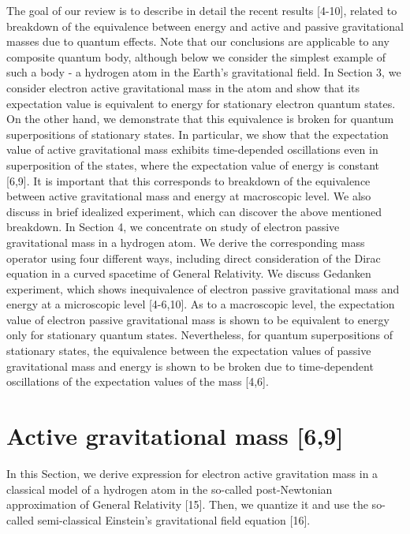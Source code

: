 \documentclass{ws-ijmpd}
\begin{document}
The goal of our review is to describe in detail the recent results
[4-10], related to breakdown of the equivalence between energy and
active and passive gravitational masses due to quantum effects.
Note that our conclusions are applicable to any composite quantum
body, although below we consider the simplest example of such a
body - a hydrogen atom in the Earth's gravitational field. In Section
3, we consider electron active gravitational mass in the atom and
show that its expectation value is equivalent to energy for
stationary electron quantum states. On the other hand, we
demonstrate that this equivalence is broken for quantum
superpositions of stationary states. In particular, we show that
the expectation value of active gravitational mass exhibits
time-depended oscillations even in superposition of the states,
where the expectation value of energy is constant [6,9]. It is important that this corresponds to breakdown of the equivalence between
active gravitational mass and energy at macroscopic level. We also
discuss in brief idealized experiment, which can discover the above
mentioned breakdown. In Section 4, we concentrate on study of
electron passive gravitational mass in a hydrogen atom. We derive
the corresponding mass operator using four different ways,
including direct consideration of the Dirac equation in a curved
spacetime of General Relativity. We discuss Gedanken experiment,
which shows inequivalence of electron passive gravitational mass
and energy at a microscopic level [4-6,10]. As to a macroscopic level, the expectation value of electron passive gravitational mass is shown
to be equivalent to energy only for stationary quantum states.
Nevertheless, for quantum superpositions of stationary states, the
equivalence between the expectation values of passive gravitational
mass and energy is shown to be broken due to time-dependent
oscillations of the expectation values of the mass [4,6].


\section{Active gravitational mass [6,9]}
In this Section, we derive expression for electron active
gravitation mass in a classical model of a hydrogen atom in the
so-called post-Newtonian approximation of General Relativity [15].
Then, we quantize it and use the so-called semi-classical
Einstein's gravitational field equation [16].
\end{document}
